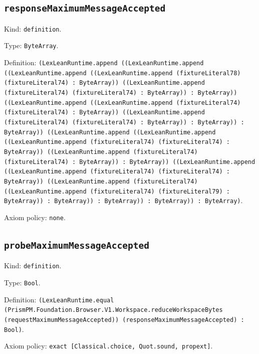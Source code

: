 \documentclass[11pt]{article}
\begin{document}
\subsection*{\texttt{responseMaximumMessageAccepted}}
\noindent Kind: \texttt{definition}.\par
\noindent Type: \texttt{ByteArray}.\par
\noindent Definition: \texttt{(LexLeanRuntime.append ((LexLeanRuntime.append ((LexLeanRuntime.append ((LexLeanRuntime.append (fixtureLiteral78) (fixtureLiteral74) : ByteArray)) ((LexLeanRuntime.append (fixtureLiteral74) (fixtureLiteral74) : ByteArray)) : ByteArray)) ((LexLeanRuntime.append ((LexLeanRuntime.append (fixtureLiteral74) (fixtureLiteral74) : ByteArray)) ((LexLeanRuntime.append (fixtureLiteral74) (fixtureLiteral74) : ByteArray)) : ByteArray)) : ByteArray)) ((LexLeanRuntime.append ((LexLeanRuntime.append ((LexLeanRuntime.append (fixtureLiteral74) (fixtureLiteral74) : ByteArray)) ((LexLeanRuntime.append (fixtureLiteral74) (fixtureLiteral74) : ByteArray)) : ByteArray)) ((LexLeanRuntime.append ((LexLeanRuntime.append (fixtureLiteral74) (fixtureLiteral74) : ByteArray)) ((LexLeanRuntime.append (fixtureLiteral74) ((LexLeanRuntime.append (fixtureLiteral74) (fixtureLiteral79) : ByteArray)) : ByteArray)) : ByteArray)) : ByteArray)) : ByteArray)}.\par
\noindent Axiom policy: \texttt{none}.\par
\subsection*{\texttt{probeMaximumMessageAccepted}}
\noindent Kind: \texttt{definition}.\par
\noindent Type: \texttt{Bool}.\par
\noindent Definition: \texttt{(LexLeanRuntime.equal (PrismPM.Foundation.Browser.V1.Workspace.reduceWorkspaceBytes (requestMaximumMessageAccepted)) (responseMaximumMessageAccepted) : Bool)}.\par
\noindent Axiom policy: \texttt{exact [Classical.choice, Quot.sound, propext]}.\par
\end{document}

